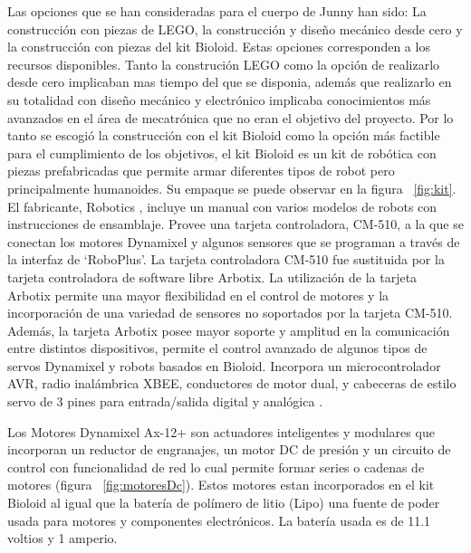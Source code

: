 Las opciones que se han consideradas para el cuerpo de Junny han sido: La construcci\'on con piezas de LEGO, la construcci\'on y dise\~no mec\'anico desde cero y la construcci\'on con piezas del kit Bioloid. Estas opciones corresponden a los recursos disponibles. Tanto la construci\'on LEGO como la opci\'on de realizarlo desde cero implicaban mas tiempo del que se disponia, adem\'as que realizarlo en su totalidad con dise\~no mec\'anico y electr\'onico implicaba conocimientos m\'as avanzados en el \'area de mecatr\'onica que no eran el objetivo del proyecto. Por lo tanto se escogi\'o la construcci\'on con el kit Bioloid como la opci\'on m\'as factible para el cumplimiento de los objetivos, el kit Bioloid es un kit de robótica con piezas prefabricadas que permite armar diferentes tipos de robot pero principalmente humanoides. Su empaque se puede observar en la figura ~\ref{fig:kit}. El fabricante, Robotics \cite{robotics1}, incluye un manual con varios modelos de robots con instrucciones de ensamblaje. Provee una tarjeta controladora, CM-510, a la que se conectan los motores Dynamixel y algunos sensores que se programan a través de la interfaz de ‘RoboPlus’\cite{robotics}. La tarjeta controladora CM-510 fue sustituida por la tarjeta controladora de software libre Arbotix. La utilización de la tarjeta Arbotix permite una mayor flexibilidad en el control de motores y la incorporación de una variedad de sensores no soportados por la tarjeta CM-510.
Además, la tarjeta Arbotix posee mayor soporte y amplitud en la comunicación entre distintos dispositivos, permite el control avanzado de algunos tipos de servos Dynamixel y robots basados en Bioloid. Incorpora un microcontrolador \gls{AVR}, radio inalámbrica \gls{XBEE}, conductores de motor dual, y cabeceras de estilo servo de 3 pines para entrada/salida digital y analógica \cite{arbotix}.

Los Motores Dynamixel Ax-12+ son actuadores inteligentes y modulares que incorporan un reductor de engranajes, un motor DC de presión y un circuito de control con funcionalidad de red lo cual permite formar series o cadenas de motores (figura ~\ref{fig:motoresDc}). Estos motores estan incorporados en el kit Bioloid al igual que la batería de polímero de litio (Lipo) una fuente de poder usada para motores y componentes electr\'onicos. La batería usada es de 11.1 voltios y 1 amperio. \cite{bateria}





